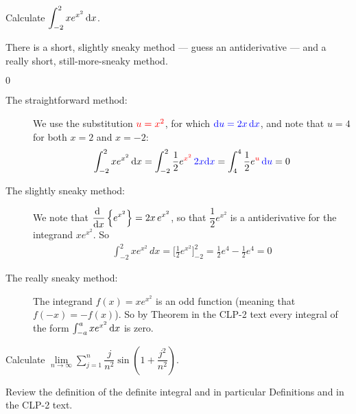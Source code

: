 \begin{question}[2016A]
Calculate $\displaystyle\int_{-2}^2 xe^{x^2}\,\mathrm{d}x$.
\end{question}

\begin{hint}
There is a short, slightly sneaky method --- guess an antiderivative ---
and a really short, still-more-sneaky method.
\end{hint}

\begin{answer}
$0$
\end{answer}

\begin{solution}
\begin{description}
\item[The straightforward method:]
We use the substitution $\textcolor{red}{u=x^2}$, for which $\textcolor{blue}{\mathrm{d}u=2x\,\mathrm{d}x}$, and note that
$u=4$ for both $x=2$ and $x=-2$:
\begin{align*}
\int_{-2}^2 xe^{x^2}\,\mathrm{d}x
=\int_{-2}^2 \frac{1}{2}e^{\textcolor{red}{x^2}}\,\textcolor{blue}{2x\mathrm{d}x} 
= \int_4^4 \frac{1}{2}e^{\textcolor{red}{u}}\,\textcolor{blue}{\mathrm{d}u}
=0
\end{align*}

\item[The slightly sneaky method:]
We note that $\displaystyle\diff{}{x} \left\{e^{x^2} \right\}= 2x\, e^{x^2}$, so that $\dfrac{1}{2} e^{x^2}$
is a antiderivative for the integrand $x e^{x^2}$. So
\begin{align*}
\int_{-2}^2 xe^{x^2}\,dx = \bigg[\frac{1}{2}e^{x^2}\bigg]_{-2}^2
=\frac{1}{2}e^4-\frac{1}{2}e^4=0
\end{align*}


\item[The really sneaky method:]
The integrand $f(x) = x e^{x^2}$ is an odd function (meaning that $f(-x)=-f(x)$).
So by Theorem  in the  CLP-2 text every integral
of the form $\int_{-a}^a x e^{x^2}\,\mathrm{d}x$ is zero.
\end{description}
\end{solution}



\begin{question}[2000D]
Calculate $\displaystyle\lim\limits_{n\rightarrow\infty}\sum\limits_{j=1}^n
\dfrac{j}{n^2}\sin\left(1+\dfrac{j^2}{n^2}\right)$.
\end{question}

\begin{hint}
Review the definition of the definite integral and in particular
Definitions    and
                  in the
CLP-2 text.
\end{hint}

